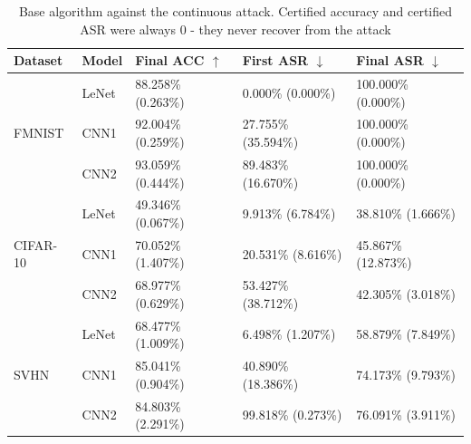 \documentclass[conference,compsoc]{IEEEtran}
\begin{document}
\begin{table}[H]
\centering
\caption{Base algorithm against the continuous attack. Certified accuracy and certified ASR were always 0 - they never recover from the attack}
\begin{tabular}{lllll}
\hline
\textbf{Dataset} & \textbf{Model} & \textbf{Final ACC} $\uparrow$ & \textbf{First ASR} $\downarrow$ & \textbf{Final ASR} $\downarrow$ \\
\hline
\multirow{3}{*}{FMNIST} & LeNet & 88.258\% (0.263\%) & 0.000\% (0.000\%) & 100.000\% (0.000\%) \\
& CNN1 & 92.004\% (0.259\%) & 27.755\% (35.594\%) & 100.000\% (0.000\%) \\
& CNN2 & 93.059\% (0.444\%) & 89.483\% (16.670\%) & 100.000\% (0.000\%) \\
\hline
\multirow{3}{*}{CIFAR-10} & LeNet & 49.346\% (0.067\%) & 9.913\% (6.784\%) & 38.810\% (1.666\%) \\
& CNN1 & 70.052\% (1.407\%) & 20.531\% (8.616\%) & 45.867\% (12.873\%) \\
& CNN2 & 68.977\% (0.629\%) & 53.427\% (38.712\%) & 42.305\% (3.018\%) \\
\hline
\multirow{3}{*}{SVHN} & LeNet & 68.477\% (1.009\%) & 6.498\% (1.207\%) & 58.879\% (7.849\%) \\
& CNN1 & 85.041\% (0.904\%) & 40.890\% (18.386\%) & 74.173\% (9.793\%) \\
& CNN2 & 84.803\% (2.291\%) & 99.818\% (0.273\%) & 76.091\% (3.911\%) \\
\hline
\end{tabular}
\end{table}

\newpage
\end{document}
